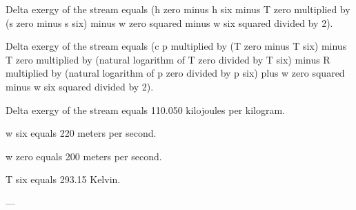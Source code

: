 Delta exergy of the stream equals (h zero minus h six minus T zero multiplied by (s zero minus s six) minus w zero squared minus w six squared divided by 2).  

Delta exergy of the stream equals (c p multiplied by (T zero minus T six) minus T zero multiplied by (natural logarithm of T zero divided by T six) minus R multiplied by (natural logarithm of p zero divided by p six) plus w zero squared minus w six squared divided by 2).  

Delta exergy of the stream equals 110.050 kilojoules per kilogram.  

w six equals 220 meters per second.  

w zero equals 200 meters per second.  

T six equals 293.15 Kelvin.  

---